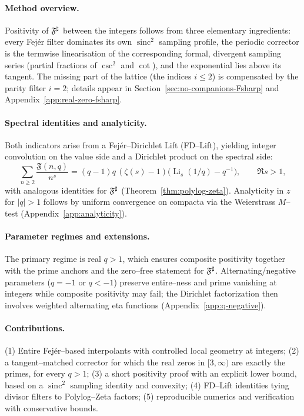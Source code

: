 \paragraph{Method overview.}
Positivity of $\mathfrak F^{\sharp}$ between the integers follows from three elementary ingredients: every Fej\'er filter dominates its own $\operatorname{sinc}^2$ sampling profile, the periodic corrector is the termwise linearisation of the corresponding formal, divergent sampling series (partial fractions of $\csc^2$ and $\cot$), and the exponential lies above its tangent. The missing part of the lattice (the indices $i\le2$) is compensated by the parity filter $i=2$; details appear in Section~\ref{sec:no-companions-Fsharp} and Appendix~\ref{app:real-zero-fsharp}.

\paragraph{Spectral identities and analyticity.}
Both indicators arise from a Fej\'er–Dirichlet Lift (FD–Lift), yielding integer convolution on the value side and a Dirichlet product on the spectral side:
\[
\sum_{n\ge2}\frac{\mathfrak F(n,q)}{n^{s}}
=(q-1)q\,(\zeta(s)-1)\Big(\operatorname{Li}_s(1/q)-q^{-1}\Big),\qquad \Re s>1,
\]
with analogous identities for $\mathfrak F^{\sharp}$ (Theorem~\ref{thm:polylog-zeta}).
Analyticity in $z$ for $|q|>1$ follows by uniform convergence on compacta via the Weierstrass $M$–test (Appendix~\ref{app:analyticity}).

\paragraph{Parameter regimes and extensions.}
The primary regime is real $q>1$, which ensures composite positivity together with the prime anchors and the zero–free statement for $\mathfrak F^{\sharp}$.
Alternating/negative parameters ($q=-1$ or $q<-1$) preserve entire–ness and prime vanishing at integers while composite positivity may fail; the Dirichlet factorization then involves weighted alternating eta functions (Appendix~\ref{app:q-negative}).

\paragraph{Contributions.}
(1) Entire Fej\'er–based interpolants with controlled local geometry at integers;
(2) a tangent–matched corrector for which the real zeros in $[3,\infty)$ are exactly the primes, for every $q>1$;
(3) a short positivity proof with an explicit lower bound, based on a $\operatorname{sinc}^2$ sampling identity and convexity;
(4) FD–Lift identities tying divisor filters to Polylog–Zeta factors;
(5) reproducible numerics and verification with conservative bounds.

